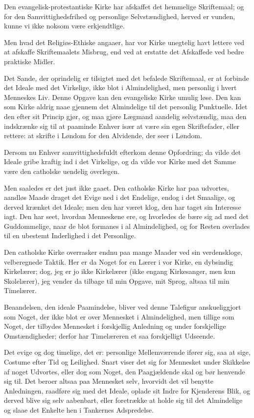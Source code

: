 \documentclass[12pt,a4paper]{book}
\newcommand{\apage}[1]{\marginnote{\footnotesize\textit{[#1]}}}
\begin{document}
Den evangelisk-protestantiske Kirke har afskaffet det hemmelige Skriftemaal;
og for den Samvittighedsfrihed og personlige Selvstændighed, herved er
vunden, kunne vi ikke noksom være erkjendtlige.

Men hvad det Religiøs-Ethiske angaaer, har vor Kirke unegtelig havt lettere
ved at afskaffe Skriftemaalets Misbrug, end ved at erstatte det Afskaffede
ved bedre praktiske Midler.

Det Sande, der oprindelig er tilsigtet med det befalede Skriftemaal, er at
forbinde det Ideale med det Virkelige, ikke \apage{110}
blot i Almindelighed, men personlig i hvert Menneskes Liv. Denne Opgave kan
den evangeliske Kirke umulig løse. Den kan som Kirke aldrig naae gjennem
det Almindelige til det personlig Punktuelle. Idet den efter sit Princip
gjør, og maa gjøre Lægmand aandelig selvstændig, maa den indskrænke sig til
at paaminde Enhver især at være sin egen Skriftefader, eller rettere: at
skrifte i Løndom for den Alvidende, der seer i Løndom.

Dersom nu Enhver samvittighedsfuldt efterkom denne Opfordring; da vilde det
Ideale gribe kraftig ind i det Virkelige, og da vilde vor Kirke med det
Samme være den catholske uendelig overlegen.

Men saaledes er det just ikke gaaet. Den catholske Kirke har paa udvortes,
aandløs Maade draget det Evige ned i det Endelige, endog i det Smaalige, og
derved krænket det Ideale; men den har været klog, den har taget sin
Interesse iagt. Den har seet, hvordan Menneskene ere, og hvorledes de bære
sig ad med det Guddommelige, naar de blot formanes i al Almindelighed, og
for Resten overlades til en ubestemt Inderlighed i det Personlige.

Den catholske Kirke overrasker endnu paa mange Maader ved sin
verdenskloge, velberegnede Taktik. Her er da Noget for en Lærer i vor
Kirke, en dybsindig Kirkelærer; dog, jeg er jo ikke Kirkelærer (ikke engang
Kirkesanger, men kun Skolelærer), jeg vender da tilbage til min Opgave, mit
Sprog, altsaa til min Timelærer.

Beaandelsen, den ideale Paamindelse, bliver ved denne Talefigur
anskueliggjort som Noget, der ikke blot er over Mennesket i Almindelighed,
men tillige som Noget, der tilbydes Mennesket i forskjellig Anledning og
under forskjellige Omstændigheder; derfor har Timelæreren et saa
forskjelligt Udseende.

Det evige og dog timelige, det er: personlige Mellemværende ifører sig, saa
at sige, Costume efter Tid og Leilighed. Snart viser det sig for Mennesket
under Skikkelse af \apage{111}
noget Udvortes, eller dog som Noget, den Paagjældende skal og bør henvende
sig til. Det beroer altsaa paa Mennesket selv, hvorvidt det vil benytte
Anledningen, raadføre sig med det Ideale, oplade sit Indre for Kjenderens
Blik, og derved blive sig selv aabenbart, eller foretrække at holde sig til
det Almindelige og slaae det Enkelte hen i Tankernes Adspredelse.
\end{document}
